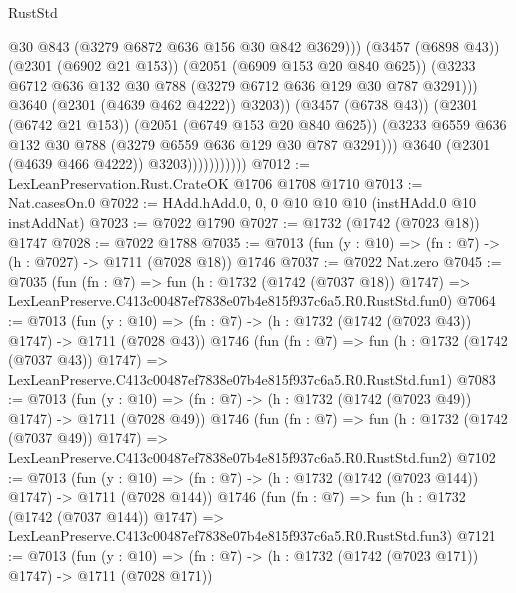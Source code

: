 \begin{lexlean}{RustStd}
\begin{coremodule}
                                      @30
                                      @843
                                      (@3279 @6872 @636 @156 @30 @842 @3629)))
                                  (@3457 (@6898 @43))
                                  (@2301 (@6902 @21 @153))
                                  (@2051 (@6909 @153 @20 @840 @625))
                                  (@3233
                                    @6712
                                    @636
                                    @132
                                    @30
                                    @788
                                    (@3279 @6712 @636 @129 @30 @787 @3291)))
                                @3640
                                (@2301 (@4639 @462 @4222))
                                @3203))
                            (@3457 (@6738 @43))
                            (@2301 (@6742 @21 @153))
                            (@2051 (@6749 @153 @20 @840 @625))
                            (@3233 @6559 @636 @132 @30 @788 (@3279 @6559 @636 @129 @30 @787 @3291)))
                          @3640
                          (@2301 (@4639 @466 @4222))
                          @3203)))))))))))
@7012 := LexLeanPreservation.Rust.CrateOK @1706 @1708 @1710
@7013 := Nat.casesOn.{0}
@7022 := HAdd.hAdd.{0, 0, 0} @10 @10 @10 (instHAdd.{0} @10 instAddNat)
@7023 := @7022 @1790
@7027 := @1732 (@1742 (@7023 @18)) @1747
@7028 := @7022 @1788
@7035 := @7013 (fun (y : @10) => (fn : @7) -> (h : @7027) -> @1711 (@7028 @18)) @1746
@7037 := @7022 Nat.zero
@7045 := @7035
    (fun (fn : @7) =>
    fun (h : @1732 (@1742 (@7037 @18)) @1747) =>
    LexLeanPreserve.C413c00487ef7838e07b4e815f937c6a5.R0.RustStd.fun0)
@7064 := @7013
    (fun (y : @10) => (fn : @7) -> (h : @1732 (@1742 (@7023 @43)) @1747) -> @1711 (@7028 @43))
    @1746
    (fun (fn : @7) =>
    fun (h : @1732 (@1742 (@7037 @43)) @1747) =>
    LexLeanPreserve.C413c00487ef7838e07b4e815f937c6a5.R0.RustStd.fun1)
@7083 := @7013
    (fun (y : @10) => (fn : @7) -> (h : @1732 (@1742 (@7023 @49)) @1747) -> @1711 (@7028 @49))
    @1746
    (fun (fn : @7) =>
    fun (h : @1732 (@1742 (@7037 @49)) @1747) =>
    LexLeanPreserve.C413c00487ef7838e07b4e815f937c6a5.R0.RustStd.fun2)
@7102 := @7013
    (fun (y : @10) => (fn : @7) -> (h : @1732 (@1742 (@7023 @144)) @1747) -> @1711 (@7028 @144))
    @1746
    (fun (fn : @7) =>
    fun (h : @1732 (@1742 (@7037 @144)) @1747) =>
    LexLeanPreserve.C413c00487ef7838e07b4e815f937c6a5.R0.RustStd.fun3)
@7121 := @7013
    (fun (y : @10) => (fn : @7) -> (h : @1732 (@1742 (@7023 @171)) @1747) -> @1711 (@7028 @171))

\end{coremodule}
\end{lexlean}
